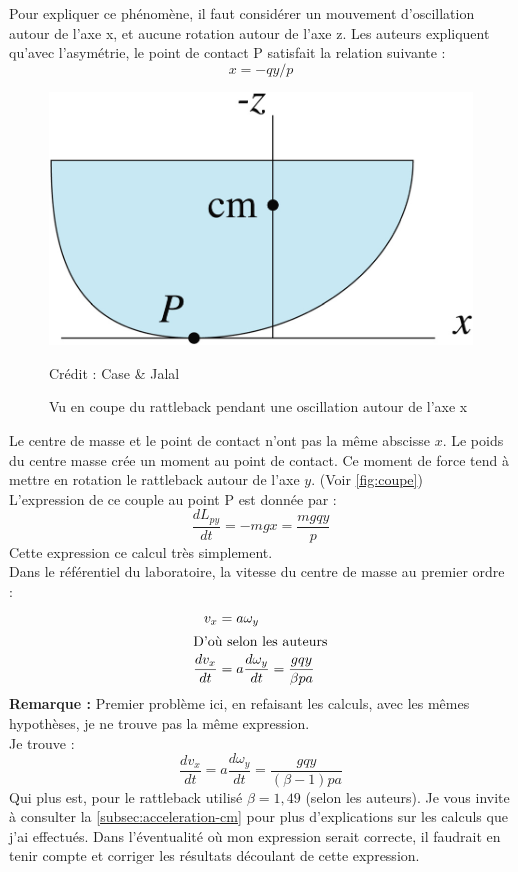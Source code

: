 \documentclass[12pt,a4paper]{article}
\begin{document}
	Pour expliquer ce phénomène, il faut considérer un mouvement d'oscillation autour de l'axe x, et aucune rotation autour de l'axe z.
	Les auteurs expliquent qu'avec l'asymétrie, le point de contact P satisfait la relation suivante :
	\begin{equation}
		\label{eq:asymetrie}
		x=-qy/p
	\end{equation}
	
	\begin{figure}
		\centering
		\includegraphics[width=0.7\linewidth]{res/coupe}
		\caption{Vu en coupe du rattleback pendant une oscillation autour de l'axe x}{Crédit : Case \& Jalal}
		\label{fig:coupe}
	\end{figure}
	Le centre de masse et le point de contact n'ont pas la même abscisse $x$. Le poids du centre masse crée un moment au point de contact. Ce moment de force tend à mettre en rotation le rattleback autour de l'axe $y$. (Voir \autoref{fig:coupe})\\
	L'expression de ce couple au point P est donnée par :
	\begin{equation}
	\dfrac{dL_{py}}{dt}=-mgx=\dfrac{mgqy}{p}
	\end{equation}
	Cette expression ce calcul très simplement.\\
	Dans le référentiel du laboratoire, la vitesse du centre de masse au premier ordre :
	\begin{align}
	v_x&=a \omega_y\\
	\intertext{D'où selon les auteurs}
	\label{eq:acc-cm}
	\dfrac{dv_x}{dt}&=a\dfrac{d\omega_y}{dt}=\dfrac{gqy}{\beta p a}
	\end{align}
	\textbf{Remarque : } Premier problème ici, en refaisant les calculs, avec les mêmes hypothèses, je ne trouve pas la même expression.\\
	Je trouve : 
	$$\dfrac{dv_x}{dt}=a\dfrac{d\omega_y}{dt}=\dfrac{gqy}{(\beta-1) p a}$$
	Qui plus est, pour le rattleback utilisé $\beta=1,49$ (selon les auteurs). Je vous invite à consulter la \autoref{subsec:acceleration-cm} pour plus d'explications sur les calculs que j'ai effectués. Dans l'éventualité où mon expression serait correcte, il faudrait en tenir compte et corriger les résultats découlant de cette expression.
	
\end{document}
